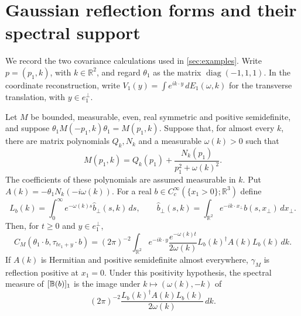 \documentclass[11pt,letterpaper,reqno]{amsart}
\makeatletter
\theoremstyle{definition}
\newcommand{\ms@minorstart}{%
  \pushQED{\qed}\renewcommand{\qedsymbol}{$\blacksquare$}}
\newenvironment{lemma}[1][]{\ms@minorstart\ms@lemma[#1]}
  {\popQED\endms@lemma}
\theoremstyle{remark}
\newcommand{\R}{\mathbb R}\newcommand{\C}{\mathbb C}
\makeatother
\begin{document}
\appendix
\section{Gaussian reflection forms and their spectral support}
\label{app:gaussian-examples}

We record the two covariance calculations used in
\cref{sec:examples}. Write $p=(p_1,k)$, with $k\in\R^2$, and regard
$\theta_1$ as the matrix $\operatorname{diag}(-1,1,1)$.
In the coordinate reconstruction, write
$V_1(y)=\int e^{ik\cdot y}\,dE_1(\omega,k)$ for the transverse
translation, with $y\in e_1^\perp$.

\begin{lemma}[A time-kernel formula]\label{lem:example-time-kernel}
Let $M$ be bounded, measurable, even, real symmetric and positive
semidefinite, and suppose
$\theta_1M(-p_1,k)\theta_1=M(p_1,k)$. Suppose that, for almost every
$k$, there are matrix polynomials $Q_k,N_k$ and a measurable
$\omega(k)>0$ such that
\[
 M(p_1,k)=Q_k(p_1)+\frac{N_k(p_1)}{p_1^2+\omega(k)^2}.
\]
The coefficients of these polynomials are assumed measurable in $k$.
Put $A(k)=-\theta_1N_k(-i\omega(k))$. For a real
$b\in C_c^\infty(\{x_1>0\};\R^3)$ define
\[
 L_b(k)=\int_0^\infty e^{-\omega(k)s}\widehat b_\perp(s,k)\,ds,
 \qquad
 \widehat b_\perp(s,k)=\int_{\R^2}e^{-ik\cdot x_\perp}b(s,x_\perp)\,dx_\perp.
\]
Then, for $t\ge0$ and $y\in e_1^\perp$,
\begin{equation}\label{eq:example-time-kernel}
 C_M(\theta_1\cdot b,\tau_{te_1+y}\cdot b)
 =(2\pi)^{-2}\int_{\R^2}e^{-ik\cdot y}
       \frac{e^{-\omega(k)t}}{2\omega(k)}
       L_b(k)^\dagger A(k)L_b(k)\,dk.
\end{equation}
If $A(k)$ is Hermitian and positive semidefinite almost everywhere,
$\gamma_M$ is reflection positive at $x_1=0$. Under this positivity
hypothesis, the spectral measure of $[\mathbb B(b)]_1$ is the image under
$k\mapsto(\omega(k),-k)$ of
\[
 (2\pi)^{-2}\frac{L_b(k)^\dagger A(k)L_b(k)}{2\omega(k)}\,dk.
\]
\end{lemma}
\end{document}
